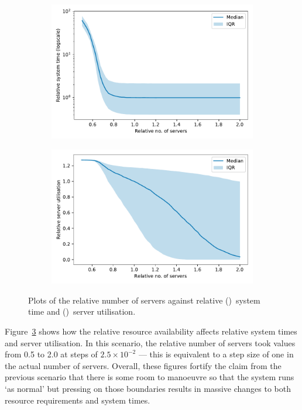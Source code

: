 \begin{figure}
    \centering
    \begin{subfigure}{.5\imgwidth}
        \includegraphics[width=\linewidth]{servers_time}
        \caption{}\label{fig:servers_time}
    \end{subfigure}\hfill%
    \begin{subfigure}{.5\imgwidth}
        \includegraphics[width=\linewidth]{servers_util}
        \caption{}\label{fig:servers_util}
    \end{subfigure}
    \caption{%
        Plots of the relative number of servers against relative
        ()~system time and
        ()~server utilisation.
    }\label{fig:servers}
\end{figure}

Figure~\ref{fig:servers} shows how the relative resource availability affects
relative system times and server utilisation. In this scenario, the relative
number of servers took values from 0.5 to 2.0 at steps of \(2.5 \times 10^{-2}\)
--- this is equivalent to a step size of one in the actual number of servers.
Overall, these figures fortify the claim from the previous scenario that there
is some room to manoeuvre so that the system runs `as normal' but pressing on
those boundaries results in massive changes to both resource requirements and
system times.

